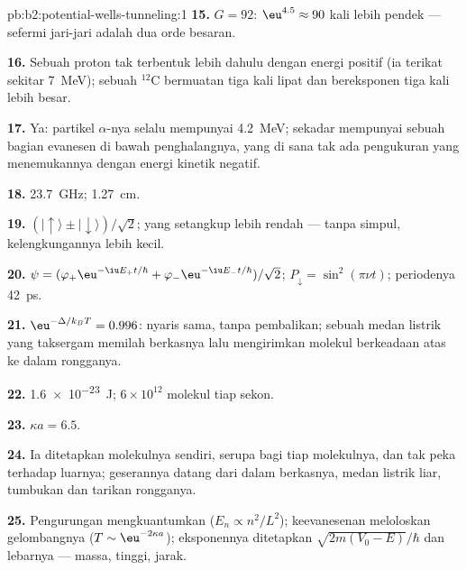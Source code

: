 \begin{solution}{pb:b2:potential-wells-tunneling:1}
\textbf{15.} $G = 92$: $\eu^{4.5} \approx 90$ kali lebih pendek --- sefermi jari-jari
adalah dua orde besaran.

\textbf{16.} Sebuah proton tak terbentuk lebih dahulu dengan energi positif (ia
terikat sekitar \qty{7}{MeV}); sebuah $^{12}$C bermuatan tiga kali lipat dan bereksponen
tiga kali lebih besar.

\textbf{17.} Ya: partikel $\alpha$-nya selalu mempunyai \qty{4.2}{MeV}; 
sekadar mempunyai sebuah bagian evanesen di bawah penghalangnya, yang di sana tak ada pengukuran
yang menemukannya dengan energi kinetik negatif.

\textbf{18.} \qty{23.7}{GHz}; \qty{1.27}{cm}.

\textbf{19.} $(|{\uparrow}\rangle \pm |{\downarrow}\rangle)/\sqrt2$; yang
setangkup lebih rendah --- tanpa simpul, kelengkungannya lebih kecil.

\textbf{20.} $\psi = (\varphi_+\eu^{-\iu E_+t/\hbar} + \varphi_-\eu^{-\iu E_-t/\hbar})/\sqrt2$;
$P_{\downarrow} = \sin^2(\pi\nu t)$; periodenya \qty{42}{ps}.

\textbf{21.} $\eu^{-\Delta/k_BT} = 0.996$: nyaris sama, tanpa pembalikan; sebuah
medan listrik yang taksergam memilah berkasnya lalu mengirimkan molekul berkeadaan
atas ke dalam rongganya.

\textbf{22.} \qty{1.6e-23}{J}; $6 \times 10^{12}$ molekul tiap sekon.

\textbf{23.} $\kappa a = 6.5$.

\textbf{24.} Ia ditetapkan molekulnya sendiri, serupa bagi tiap
molekulnya, dan tak peka terhadap luarnya; geserannya datang dari
 dalam berkasnya, medan listrik liar, tumbukan dan
tarikan rongganya.

\textbf{25.} Pengurungan mengkuantumkan ($E_n \propto n^2/L^2$); keevanesenan meloloskan
gelombangnya ($T \sim \eu^{-2\kappa a}$); eksponennya ditetapkan
$\sqrt{2m(V_0 - E)}/\hbar$ dan lebarnya --- massa, tinggi, jarak.
\end{solution}
